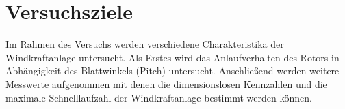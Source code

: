 \section{Versuchsziele}
Im Rahmen des Versuchs werden verschiedene Charakteristika der Windkraftanlage
 untersucht. Als Erstes wird das Anlaufverhalten des Rotors in Abhängigkeit des Blattwinkels (Pitch) untersucht. Anschließend werden weitere Messwerte aufgenommen mit denen die dimensionslosen Kennzahlen und die maximale Schnelllaufzahl der Windkraftanlage bestimmt werden können.


